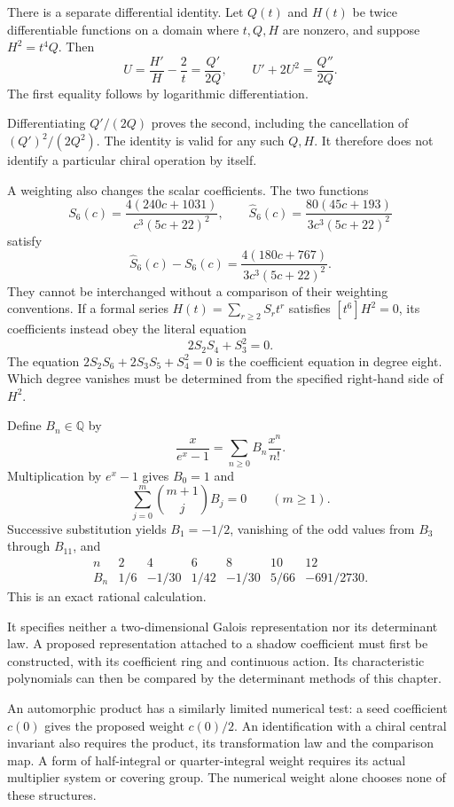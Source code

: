 There is a separate differential identity. Let \(Q(t)\) and
\(H(t)\) be twice differentiable functions on a domain where \(t,Q,H\)
are nonzero, and suppose \(H^2=t^4Q\). Then
\[
 U=\frac{H'}H-\frac2t=\frac{Q'}{2Q},
 \qquad U'+2U^2=\frac{Q''}{2Q}.
\]
The first equality follows by logarithmic differentiation.

Differentiating \(Q'/(2Q)\) proves the second, including the
cancellation of \((Q')^2/(2Q^2)\).
The identity is valid for any such \(Q,H\).
It therefore does not identify a particular chiral operation by itself.

A weighting also changes the scalar coefficients. The two functions
\[
 S_6(c)=\frac{4(240c+1031)}{c^3(5c+22)^2},
 \qquad
 \widehat S_6(c)=\frac{80(45c+193)}{3c^3(5c+22)^2}
\]
satisfy
\[
 \widehat S_6(c)-S_6(c)
   =\frac{4(180c+767)}{3c^3(5c+22)^2}.
\]
They cannot be interchanged without a comparison of their
weighting conventions. If a formal series
\(H(t)=\sum_{r\ge2}S_rt^r\) satisfies
\([t^6]H^2=0\), its coefficients instead obey the literal equation
\[
 2S_2S_4+S_3^2=0.
\]
The equation \(2S_2S_6+2S_3S_5+S_4^2=0\) is the
coefficient equation in degree eight. Which degree vanishes
must be determined from the specified right-hand side of \(H^2\).

\begin{example}
\label{v4-arith:ic:bernoulli}
Define \(B_n\in\mathbb Q\) by
\[
 \frac{x}{e^x-1}=\sum_{n\ge0}B_n\frac{x^n}{n!}.
\]
Multiplication by \(e^x-1\) gives \(B_0=1\) and
\[
 \sum_{j=0}^{m}\binom{m+1}{j}B_j=0
       \qquad(m\ge1).
\]
Successive substitution yields \(B_1=-1/2\), vanishing of the
odd values from \(B_3\) through \(B_{11}\), and
\[
 \begin{array}{c|rrrrrr}
 n&2&4&6&8&10&12\\ \hline
 B_n&1/6&-1/30&1/42&-1/30&5/66&-691/2730 .
 \end{array}
\]
This is an exact rational calculation.

It specifies neither a
two-dimensional Galois representation nor its determinant law.
A proposed representation attached to a shadow coefficient must
first be constructed, with its coefficient ring and continuous action.
Its characteristic polynomials can then be compared by the
determinant methods of this chapter.
\end{example}

An automorphic product has a similarly limited numerical test:
a seed coefficient \(c(0)\) gives the proposed weight \(c(0)/2\).
An identification with a chiral central invariant also requires
the product, its transformation law and the comparison map.
A form of half-integral or quarter-integral weight requires its
actual multiplier system or covering group.
The numerical weight alone chooses none of these structures.


